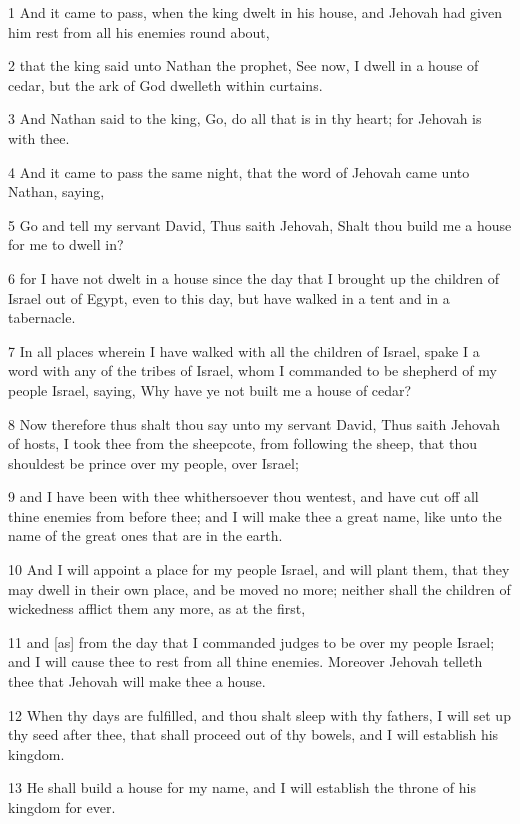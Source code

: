 \par 1 And it came to pass, when the king dwelt in his house, and Jehovah had given him rest from all his enemies round about,
\par 2 that the king said unto Nathan the prophet, See now, I dwell in a house of cedar, but the ark of God dwelleth within curtains.
\par 3 And Nathan said to the king, Go, do all that is in thy heart; for Jehovah is with thee.
\par 4 And it came to pass the same night, that the word of Jehovah came unto Nathan, saying,
\par 5 Go and tell my servant David, Thus saith Jehovah, Shalt thou build me a house for me to dwell in?
\par 6 for I have not dwelt in a house since the day that I brought up the children of Israel out of Egypt, even to this day, but have walked in a tent and in a tabernacle.
\par 7 In all places wherein I have walked with all the children of Israel, spake I a word with any of the tribes of Israel, whom I commanded to be shepherd of my people Israel, saying, Why have ye not built me a house of cedar?
\par 8 Now therefore thus shalt thou say unto my servant David, Thus saith Jehovah of hosts, I took thee from the sheepcote, from following the sheep, that thou shouldest be prince over my people, over Israel;
\par 9 and I have been with thee whithersoever thou wentest, and have cut off all thine enemies from before thee; and I will make thee a great name, like unto the name of the great ones that are in the earth.
\par 10 And I will appoint a place for my people Israel, and will plant them, that they may dwell in their own place, and be moved no more; neither shall the children of wickedness afflict them any more, as at the first,
\par 11 and [as] from the day that I commanded judges to be over my people Israel; and I will cause thee to rest from all thine enemies. Moreover Jehovah telleth thee that Jehovah will make thee a house.
\par 12 When thy days are fulfilled, and thou shalt sleep with thy fathers, I will set up thy seed after thee, that shall proceed out of thy bowels, and I will establish his kingdom.
\par 13 He shall build a house for my name, and I will establish the throne of his kingdom for ever.

